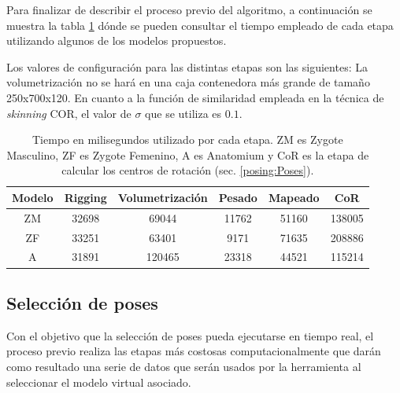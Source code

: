 




Para finalizar de describir el proceso previo del algoritmo, a continuación se muestra la tabla \ref{tab:pre_pro} dónde se pueden consultar el tiempo empleado de cada etapa utilizando algunos de los modelos propuestos. 


Los valores de configuración para las distintas etapas son las siguientes:
La volumetrización no se hará en una caja contenedora más grande de tamaño 250x700x120. En cuanto a la función de similaridad empleada en la técnica de \emph{skinning} \ac{COR}, el valor de $\sigma$ que se utiliza es $0.1$.



\begin{table}[!h]
\centering
\caption{Tiempo en milisegundos utilizado por cada etapa. ZM es Zygote Masculino, ZF es Zygote Femenino, A es Anatomium y CoR es la etapa de calcular los centros de rotación (sec. \ref{posing:Poses}).}
\begin{tabular}{cccccc}
\hline
\textbf{Modelo} & \textbf{Rigging} & \textbf{Volumetrización} & \textbf{Pesado} & \textbf{Mapeado} & \textbf{CoR }  \\ 
\hline
ZM  & 32698 & 69044 & 11762  & 51160   & 138005 \\ 
\hline
ZF  & 33251 & 63401 & 9171  & 71635   & 208886  \\ 
\hline
A   & 31891 & 120465 & 23318 & 44521  & 115214\\ 
\hline
\end{tabular}
\label{tab:pre_pro}
\end{table}



\subsection{Selección de poses}

Con el objetivo que la selección de poses pueda ejecutarse en tiempo real, el proceso previo realiza las etapas más costosas computacionalmente que darán como resultado una serie de datos que serán usados por la herramienta al seleccionar el modelo virtual asociado. 

